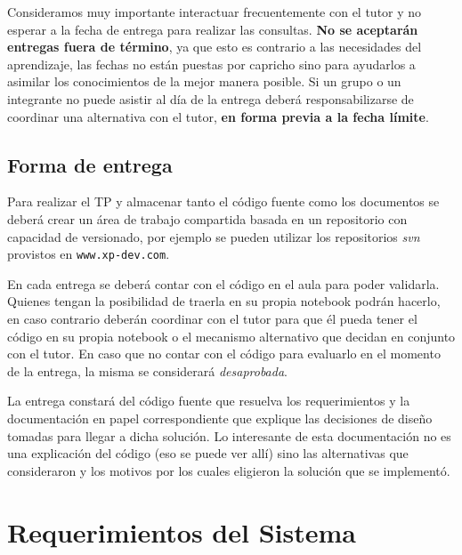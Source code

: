 {      Consideramos muy importante interactuar frecuentemente con el tutor y no esperar a la fecha de entrega para
      realizar las consultas. \textbf{No se aceptarán entregas fuera de término}, ya que esto es contrario a las necesidades
      del aprendizaje, las fechas no están puestas por capricho sino para ayudarlos a asimilar los conocimientos de la
      mejor manera posible. Si un grupo o un integrante no puede asistir al día de la entrega deberá responsabilizarse
      de coordinar una alternativa con el tutor, \textbf{en forma previa a la fecha límite}.

    \subsection{Forma de entrega}
      Para realizar el TP y almacenar tanto el código fuente como los documentos se deberá crear un área de trabajo
      compartida basada en un repositorio con capacidad de versionado, por ejemplo se pueden utilizar los repositorios
      \emph{svn} provistos en \texttt{www.xp-dev.com}.

      En cada entrega se deberá contar con el código en el aula para poder validarla. Quienes tengan la posibilidad de
      traerla en su propia notebook podrán hacerlo, en caso contrario deberán coordinar con el tutor para que él pueda
      tener el código en su propia notebook o el mecanismo alternativo que decidan en conjunto con el tutor. En caso
      que no contar con el código para evaluarlo en el momento de la entrega, la misma se considerará \emph{desaprobada}.
      
      La entrega constará del código fuente que resuelva los requerimientos y la documentación en papel correspondiente que
      explique las decisiones de diseño tomadas para llegar a dicha solución. Lo interesante de esta documentación no es una
      explicación del código (eso se puede ver allí) sino las alternativas que consideraron y los motivos por los cuales eligieron
      la solución que se implementó.


  \section{Requerimientos del Sistema}

}



